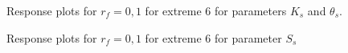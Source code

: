 \documentclass[review,times,3p,twocolumn,10pt]{elsarticle}
\begin{document}
\begin{figure}[htb!]
\label{ext6rf0-Kt}
\caption{Response plots for $r_f=0,1$ for extreme 6 for parameters $K_s$ and $\theta_s$. }
\end{figure}

\begin{figure}[htb!]
\label{ext6rf0-Ss}
\caption{Response plots for $r_f=0,1$ for extreme 6 for parameter $S_s$}
\end{figure}
\end{document}
